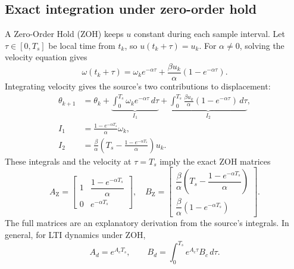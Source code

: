 \documentclass[11pt,a4paper]{article}
\numberwithin{equation}{section}
\numberwithin{figure}{section}
\numberwithin{table}{section}
\begin{document}
\subsection{Exact integration under zero-order hold}
A Zero-Order Hold (ZOH) keeps $u$ constant during each sample interval. Let $\tau\in[0,T_s]$ be local time from $t_k$, so $u(t_k+\tau)=u_k$. For $\alpha\ne0$, solving the velocity equation gives
\begin{equation}\label{eq:motoromega}
\omega(t_k+\tau)=\omega_ke^{-\alpha\tau}+\frac{\beta u_k}{\alpha}(1-e^{-\alpha\tau}).
\end{equation}
Integrating velocity gives the source's two contributions to displacement:
\begin{align}
\theta_{k+1}&=\theta_k+\underbrace{\int_0^{T_s}\omega_ke^{-\alpha\tau}\,d\tau}_{I_1}
+\underbrace{\int_0^{T_s}\frac{\beta u_k}{\alpha}(1-e^{-\alpha\tau})\,d\tau}_{I_2},\\
I_1&=\frac{1-e^{-\alpha T_s}}\alpha\omega_k,\\
I_2&=\frac\beta\alpha\left(T_s-\frac{1-e^{-\alpha T_s}}\alpha\right)u_k.
\end{align}
These integrals and the velocity at $\tau=T_s$ imply the exact ZOH matrices
\begin{equation}\label{eq:zohmotor}
A_{\mathrm Z}=\begin{bmatrix}1&\dfrac{1-e^{-\alpha T_s}}\alpha\\[2mm]0&e^{-\alpha T_s}\end{bmatrix},\quad
B_{\mathrm Z}=\begin{bmatrix}\dfrac\beta\alpha\left(T_s-\dfrac{1-e^{-\alpha T_s}}\alpha\right)\\[2mm]\dfrac\beta\alpha(1-e^{-\alpha T_s})\end{bmatrix}.
\end{equation}
The full matrices are an explanatory derivation from the source's integrals. In general, for LTI dynamics under ZOH,
\[A_d=e^{A_cT_s},\qquad B_d=\int_0^{T_s}e^{A_c\tau}B_c\,d\tau.\]
\end{document}
